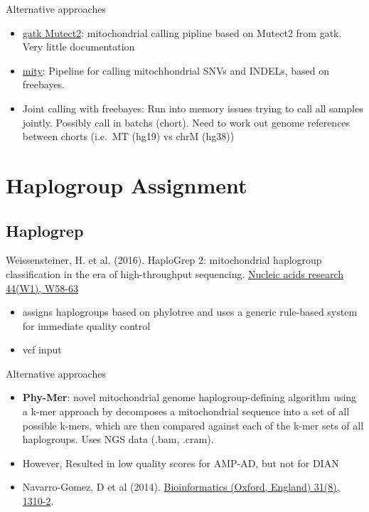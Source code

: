 \documentclass[]{book}
\providecommand{\tightlist}{%
  \setlength{\itemsep}{0pt}\setlength{\parskip}{0pt}}
\begin{document}
Alternative approaches

\begin{itemize}
\tightlist
\item
  \href{https://github.com/broadinstitute/gatk-docs/blob/master/blog-2012-to-2019/2019-03-05-New!_Mitochondrial_Analysis_with_Mutect2.md?id=23598}{gatk Mutect2}: mitochondrial calling pipline based on Mutect2 from gatk. Very little documentation
\item
  \href{https://www.biorxiv.org/content/10.1101/852210v1}{mity}: Pipeline for calling mitochhondrial SNVs and INDELs, based on freebayes.
\item
  Joint calling with freebayes: Run into memory issues trying to call all samples jointly. Possibly call in batchs (chort). Need to work out genome references between chorts (i.e.~MT (hg19) vs chrM (hg38))
\end{itemize}

\hypertarget{haplogroup-assignment}{%
\section{Haplogroup Assignment}\label{haplogroup-assignment}}

\hypertarget{haplogrep}{%
\subsection{Haplogrep}\label{haplogrep}}

Weissensteiner, H. et al. (2016). HaploGrep 2: mitochondrial haplogroup classification in the era of high-throughput sequencing. \href{https://dx.doi.org/10.1093/nar/gkw233}{Nucleic acids research 44(W1), W58-63}

\begin{itemize}
\tightlist
\item
  assigns haplogroups based on phylotree and uses a generic rule-based system for immediate quality control
\item
  vcf input
\end{itemize}

Alternative approaches

\begin{itemize}
\tightlist
\item
  \textbf{Phy-Mer}: novel mitochondrial genome haplogroup-defining algorithm using a k-mer approach by decomposes a mitochondrial sequence into a set of all possible k-mers, which are then compared against each of the k-mer sets of all haplogroups. Uses NGS data (.bam, .cram).
\item
  However, Resulted in low quality scores for AMP-AD, but not for DIAN
\item
  Navarro-Gomez, D et al (2014). \href{https://dx.doi.org/10.1093/bioinformatics/btu825}{Bioinformatics (Oxford, England) 31(8), 1310-2}.
\end{itemize}
\end{document}
